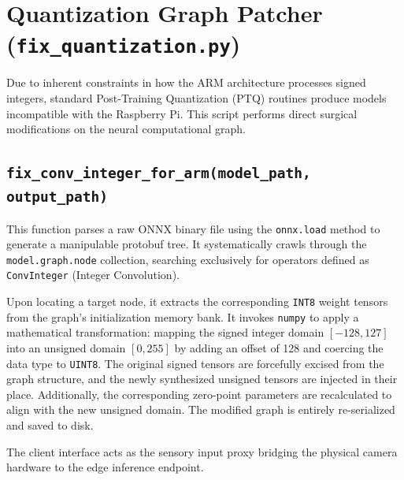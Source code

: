 \section{Quantization Graph Patcher (\texttt{fix\_quantization.py})}

Due to inherent constraints in how the ARM architecture processes signed integers, standard Post-Training Quantization (PTQ) routines produce models incompatible with the Raspberry Pi. This script performs direct surgical modifications on the neural computational graph.

\subsection{\texttt{fix\_conv\_integer\_for\_arm(model\_path, output\_path)}}
This function parses a raw ONNX binary file using the \texttt{onnx.load} method to generate a manipulable protobuf tree. It systematically crawls through the \texttt{model.graph.node} collection, searching exclusively for operators defined as \texttt{ConvInteger} (Integer Convolution). 

Upon locating a target node, it extracts the corresponding \texttt{INT8} weight tensors from the graph's initialization memory bank. It invokes \texttt{numpy} to apply a mathematical transformation: mapping the signed integer domain $[-128, 127]$ into an unsigned domain $[0, 255]$ by adding an offset of 128 and coercing the data type to \texttt{UINT8}. The original signed tensors are forcefully excised from the graph structure, and the newly synthesized unsigned tensors are injected in their place. Additionally, the corresponding zero-point parameters are recalculated to align with the new unsigned domain. The modified graph is entirely re-serialized and saved to disk.


The client interface acts as the sensory input proxy bridging the physical camera hardware to the edge inference endpoint.


